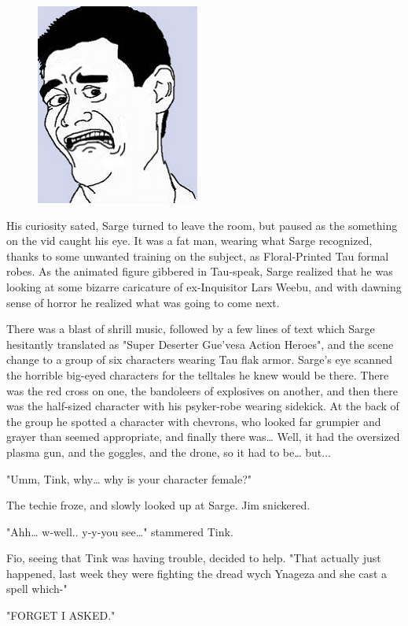 \begin{figure}
	\begin{center}
		\includegraphics[width=\figwidth]{pics/14/52.png}
	\end{center}
\end{figure}
His curiosity sated, Sarge turned to leave the room, but paused as the something on the vid caught his eye. 
It was a fat man, wearing what Sarge recognized, thanks to some unwanted training on the subject, as Floral-Printed Tau formal robes. 
As the animated figure gibbered in Tau-speak, Sarge realized that he was looking at some bizarre caricature of ex-Inquisitor Lars Weebu, and with dawning sense of horror he realized what was going to come next.

There was a blast of shrill music, followed by a few lines of text which Sarge hesitantly translated as "Super Deserter Gue'vesa Action Heroes", and the scene change to a group of six characters wearing Tau flak armor. 
Sarge's eye scanned the horrible big-eyed characters for the telltales he knew would be there. 
There was the red cross on one, the bandoleers of explosives on another, and then there was the half-sized character with his psyker-robe wearing sidekick. 
At the back of the group he spotted a character with chevrons, who looked far grumpier and grayer than seemed appropriate, and finally there was… Well, it had the oversized plasma gun, and the goggles, and the drone, so it had to be… but...

"Umm, Tink, why… why is your character female?"

The techie froze, and slowly looked up at Sarge. 
Jim snickered.

"Ahh… w-well.. 
y-y-you see…" stammered Tink.

Fio, seeing that Tink was having trouble, decided to help. 
"That actually just happened, last week they were fighting the dread wych Ynageza and she cast a spell which-"

"FORGET I ASKED."
